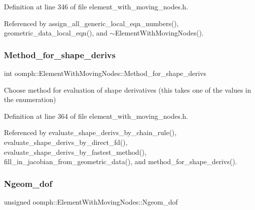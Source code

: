 Definition at line 346 of file element\+\_\+with\+\_\+moving\+\_\+nodes.\+h.



Referenced by assign\+\_\+all\+\_\+generic\+\_\+local\+\_\+eqn\+\_\+numbers(), geometric\+\_\+data\+\_\+local\+\_\+eqn(), and $\sim$\+Element\+With\+Moving\+Nodes().

\mbox{\label{classoomph_1_1ElementWithMovingNodes_a7b02491715adf7a315631938138362af}} 
\subsubsection{\texorpdfstring{Method\+\_\+for\+\_\+shape\+\_\+derivs}{Method\_for\_shape\_derivs}}
{\footnotesize\ttfamily int oomph\+::\+Element\+With\+Moving\+Nodes\+::\+Method\+\_\+for\+\_\+shape\+\_\+derivs\hspace{0.3cm}{\ttfamily [private]}}



Choose method for evaluation of shape derivatives (this takes one of the values in the enumeration) 



Definition at line 364 of file element\+\_\+with\+\_\+moving\+\_\+nodes.\+h.



Referenced by evaluate\+\_\+shape\+\_\+derivs\+\_\+by\+\_\+chain\+\_\+rule(), evaluate\+\_\+shape\+\_\+derivs\+\_\+by\+\_\+direct\+\_\+fd(), evaluate\+\_\+shape\+\_\+derivs\+\_\+by\+\_\+fastest\+\_\+method(), fill\+\_\+in\+\_\+jacobian\+\_\+from\+\_\+geometric\+\_\+data(), and method\+\_\+for\+\_\+shape\+\_\+derivs().

\mbox{\label{classoomph_1_1ElementWithMovingNodes_a346ca61cbdd374683a4fa1073a5f5dec}} 
\subsubsection{\texorpdfstring{Ngeom\+\_\+dof}{Ngeom\_dof}}
{\footnotesize\ttfamily unsigned oomph\+::\+Element\+With\+Moving\+Nodes\+::\+Ngeom\+\_\+dof\hspace{0.3cm}{\ttfamily [private]}}




